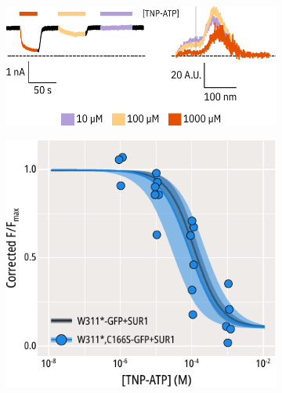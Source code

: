 \begin{figure}[hbtp]
	\centering
	\begin{subfigure}[t]{0.6\textwidth}
		\caption{}\label{ch5fig:c166s_traces}
		\centering
		\includegraphics[width=\textwidth]{c166s_5.pdf}
	\end{subfigure}
	\hfill
	\begin{subfigure}[t]{0.3\textwidth}
		\caption{}\label{ch5fig:c166s_popfits_2}
		\centering
		\includegraphics[width=\textwidth]{c166s_6.pdf}
	\end{subfigure}
	\vfill
	\begin{subfigure}[t]{0.3\textwidth}
		\caption{}\label{ch5fig:c166s_popfits_3}
		\centering

\end{subfigure}
\end{figure}
